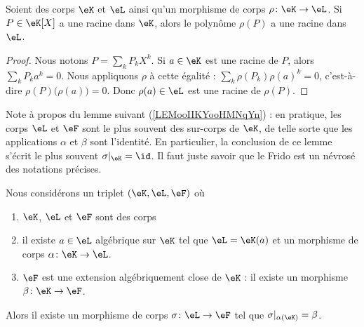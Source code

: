 \begin{lemma}
	Soient des corps \( \eK\) et \( \eL\) ainsi qu'un morphisme de corps \( \rho \colon \eK\to \eL\). Si \( P\in \eK[X]\) a une racine dans \( \eK\), alors le polynôme \( \rho(P)\) a une racine dans \( \eL\).
\end{lemma}

\begin{proof}
	Nous notons \( P=\sum_kP_kX^k\). Si \( a\in \eK\) est une racine de \( P\), alors \( \sum_kP_ka^k=0\). Nous appliquons \( \rho\) à cette égalité : \( \sum_k\rho(P_k)\rho(a)^k=0\), c'est-à-dire \( \rho(P)\big( \rho(a) \big)=0\). Donc \( \rho(a)\in \eL\) est une racine de \( \rho(P)\).
\end{proof}



Note à propos du lemme suivant (\ref{LEMooIIKYooHMNqYn}) : en pratique, les corps \( \eL\) et \( \eF\) sont le plus souvent des sur-corps de \( \eK\), de telle sorte que les applications \( \alpha\) et \( \beta\) sont l'identité. En particulier, la conclusion de ce lemme s'écrit le plus souvent \( \sigma|_{\eK}=\id\). Il faut juste savoir que le Frido est un névrosé des notations précises.

\begin{lemma}     \label{LEMooIIKYooHMNqYn}
	Nous considérons un triplet \( (\eK,\eL,\eF)\) où
	\begin{enumerate}
		\item
		      \( \eK\), \( \eL\) et \( \eF\) sont des corps
		\item
		      il existe \( a\in \eL\) algébrique sur \( \eK\) tel que \( \eL=\eK(a)\) et un morphisme de corps \( \alpha\colon \eK\to \eL\).
		\item
		      \( \eF\) est une extension algébriquement close de \( \eK\) : il existe un morphisme \( \beta\colon \eK\to \eF\).
	\end{enumerate}
	Alors il existe un morphisme de corps \( \sigma\colon \eL\to \eF\) tel que \( \sigma|_{\alpha(\eK)}=\beta\).
\end{lemma}


